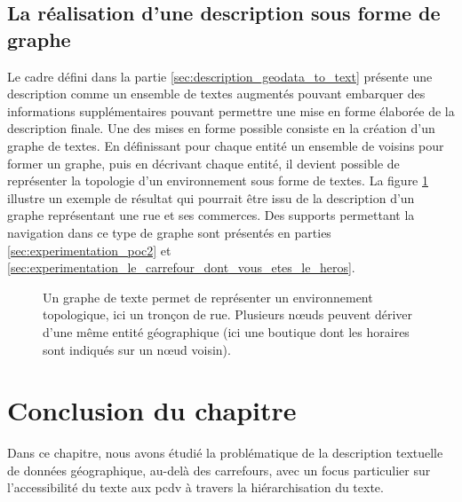 \subsection{La réalisation d'une description sous forme de graphe}

\label{sec:description_graphe}

Le cadre défini dans la partie \ref{sec:description_geodata_to_text} présente une description comme un ensemble de textes augmentés pouvant embarquer des informations supplémentaires pouvant permettre une mise en forme élaborée de la description finale. Une des mises en forme possible consiste en la création d'un graphe de textes. En définissant pour chaque entité un ensemble de voisins pour former un graphe, puis en décrivant chaque entité, il devient possible de représenter la topologie d'un environnement sous forme de textes. La figure \ref{fig:desc_graphe_texte} illustre un exemple de résultat qui pourrait être issu de la description d'un graphe représentant une rue et ses commerces. Des supports permettant la navigation dans ce type de graphe sont présentés en parties \ref{sec:experimentation_poc2} et \ref{sec:experimentation_le_carrefour_dont_vous_etes_le_heros}.

\begin{figure}[ht]
    \centering
    \caption[Graphe de texte d'un tronçon de rue]{Un graphe de texte permet de représenter un environnement topologique, ici un tronçon de rue. Plusieurs nœuds peuvent dériver d'une même entité géographique (ici une boutique dont les horaires sont indiqués sur un nœud voisin).}
    \label{fig:desc_graphe_texte}
\end{figure}

\section{Conclusion du chapitre}

Dans ce chapitre, nous avons étudié la problématique de la description textuelle de données géographique, au-delà des carrefours, avec un focus particulier sur l'accessibilité du texte aux \gls{pcdv} à travers la hiérarchisation du texte. 

